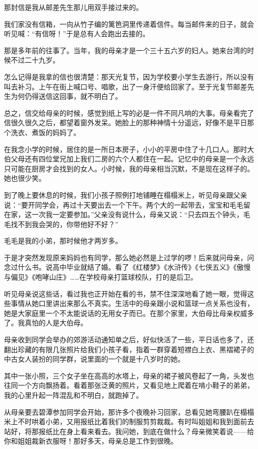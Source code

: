 \par 那封信是我从邮差先生那儿用双手接过来的。
\par 我们家没有信箱，一向从竹子编的篱笆洞里传递着信件。每当邮件来的日子，就会听见喊：“有信呀！”于是总有人会跑出去接的。
\par 那是多年前的往事了。当年，我的母亲才是一个三十五六岁的妇人。她来台湾的时候不过二十九岁。
\par 怎么记得是我拿的信也很清楚：那天光复节，因为学校要小学生去游行，所以没有叫去补习。上午在街上喊口号、唱歌，出了一身汗便给回家了。至于光复节邮差先生为何仍得送信这回事，就不明白了。
\par 总之，信交给母亲的时候，感觉到纸上写的必是一件不同凡响的大事。母亲看完了信很久很久之后，都望着窗外发呆。她脸上的那种神情十分遥远，好像不是平日那个洗衣、煮饭的妈妈了。
\par 在我念小学的时候，居住的是一所日本房子，小小的平房中住了十几口人。那时大伯父母还有四位堂兄加上我们二房的六个人都住在一起。记忆中的母亲是一个永远只可能在厨房才会找到的女人。小时候，我的母亲相当沉默，不是现在这样子的。她也很少笑。
\par 到了晚上要休息的时候，我们小孩子照例打地铺睡在榻榻米上，听见母亲跟父亲说：“要开同学会，再过十天要出去一个下午。两个大的一起带去，宝宝和毛毛留在家，这一次我一定要参加。”父亲没有说什么，母亲又说：“只去四五个钟头，毛毛找不到我会哭的，你带他好不好？”
\par 毛毛是我的小弟，那时候他才两岁多。
\par 于是才突然发现原来妈妈也有同学，那么她必然是上过学的啰！后来就问母亲，问念过什么书。说高中毕业就结了婚。看了《红楼梦》《水浒传》《七侠五义》《傲慢与偏见》《咆哮山庄》……在学校母亲打篮球校队，打的是后卫。
\par 听见母亲说这些话，看过我也正开始在看的书，禁不住深深地看了她一眼，觉得这些事情从她口里讲出来那么不真实。生活中的母亲跟小说和篮球一点关系也没有，她是大家庭里一个不太能说话的无用女子而已。在那个家里，大伯母比母亲权威多了。我真怕的人是大伯母。
\par 母亲收到同学会举办的郊游活动通知单之后，好似快活了一些，平日话也多了，还翻出珍藏的有限几张照片给我们小孩子看，指着一群穿着短襟白上衣、黑褶裙子的中古女人装扮的同学群，说里面的一个就是十八岁时的她。
\par 其中一张小照，三个女子坐在高高的水塔上，母亲的裙子被风卷起了一角，头发也往同一个方向飘扬着。看着那张泛黄的照片，又看见地上爬着在啃小鞋子的弟弟，我的心里升起一阵混乱和不明白，就跑掉了。
\par 从母亲要去碧潭参加同学会开始，那许多个夜晚补习回家，总看见她弯腰趴在榻榻米上不时哄着小弟，又用报纸比着我们的制服剪剪裁裁。有时叫姐姐和我到面前去站好，将那报纸比在身上看来看去。我问她，到底在做什么？母亲微笑着说——给你和姐姐裁新衣服呀！那好多天，母亲总是工作到很晚。
